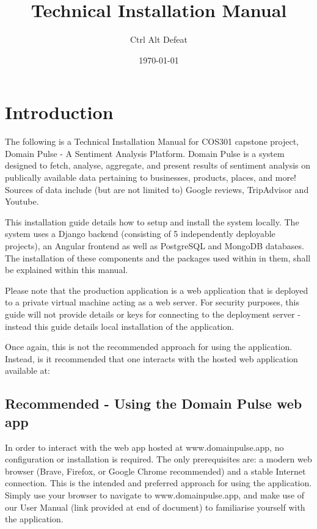 \documentclass[12pt]{article}
\title{Technical Installation Manual}
\author{Ctrl Alt Defeat}
\date{\today}
\begin{document}
\maketitle

\tableofcontents


\section{Introduction}
The following is a Technical Installation Manual for COS301 capstone project, Domain Pulse - A Sentiment Analysis Platform. Domain Pulse is
a system designed to fetch, analyse, aggregate, and present results of sentiment analysis on publically available data pertaining to
businesses, products, places, and more! Sources of data include (but are not limited to) Google reviews, TripAdvisor and Youtube.

This installation guide details how to setup and install the system locally. The system uses a Django backend (consisting of 5 independently deployable projects),
an Angular frontend as well as PostgreSQL and MongoDB databases. The installation of these components and the packages used within in
them, shall be explained within this manual.

Please note that the production application is a web application that is deployed to a private virtual machine acting as a web server. For
security purposes, this guide will not provide details or keys for connecting to the deployment server - instead this guide details local installation
of the application.

Once again, this is not the recommended approach for using the application. Instead, is it recommended that one interacts with the hosted web
application available at: 

\subsection{Recommended - Using the Domain Pulse web app}
In order to interact with the web app hosted at www.domainpulse.app, no configuration or installation is required. The only
prerequisites are: a modern web browser (Brave, Firefox, or Google Chrome recommended) and a stable Internet connection. This is the
intended and preferred approach for using the application. Simply use your browser to navigate to www.domainpulse.app, and make use of
our User Manual (link provided at end of document) to familiarise yourself with the application.
\end{document}
